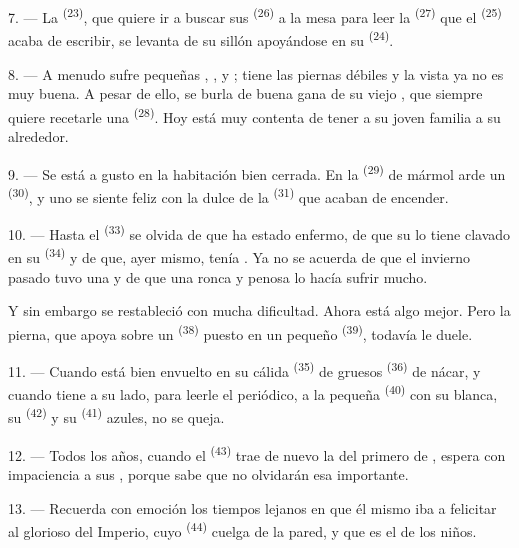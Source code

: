 7. --- La  \textsuperscript{(23)}, que quiere ir a buscar sus
 \textsuperscript{(26)} a la mesa para leer la 
\textsuperscript{(27)} que el  \textsuperscript{(25)} acaba de escribir, se
levanta de su sillón apoyándose en su  \textsuperscript{(24)}.

8. --- A menudo sufre pequeñas , ,
 y ; tiene las piernas débiles y
la vista ya no es muy buena. A pesar de ello, se burla de buena gana de
su viejo , que siempre quiere recetarle una 
\textsuperscript{(28)}. Hoy está muy contenta de tener a su joven familia a su
alrededor.

9. --- Se está a gusto en la habitación bien cerrada. En la
 \textsuperscript{(29)} de mármol arde un 
\textsuperscript{(30)}, y uno se siente feliz con la dulce  de la
 \textsuperscript{(31)} que acaban de encender.

\VUsaut{4.2mm}
\VUsaut{3.0mm}

10. --- Hasta el  \textsuperscript{(33)} se olvida de que ha estado
enfermo, de que su  lo tiene clavado en su 
\textsuperscript{(34)} y de que, ayer mismo, tenía . Ya
no se acuerda de que el invierno pasado tuvo una  y de que
una  ronca y penosa lo hacía sufrir mucho.

Y sin embargo se restableció con mucha dificultad. Ahora está algo mejor.
Pero la pierna, que apoya sobre un  \textsuperscript{(38)} puesto en
un pequeño  \textsuperscript{(39)}, todavía le duele.

11. --- Cuando está bien envuelto en su cálida  \textsuperscript{(35)}
de gruesos  \textsuperscript{(36)} de nácar, y cuando tiene a su
lado, para leerle el periódico, a la pequeña 
\textsuperscript{(40)} con su  blanca, su 
\textsuperscript{(42)} y su  \textsuperscript{(41)} azules, no se queja.

12. --- Todos los años, cuando el  \textsuperscript{(43)} trae de
nuevo la  del primero de , espera con
impaciencia a sus , porque sabe que no olvidarán esa
 importante.

13. --- Recuerda con emoción los tiempos lejanos en que él mismo iba a
felicitar al glorioso  del Imperio, cuyo 
\textsuperscript{(44)} cuelga de la pared, y que es el  de los
niños.
\VUsaut{6.0mm}
\VUfilet{22mm}
